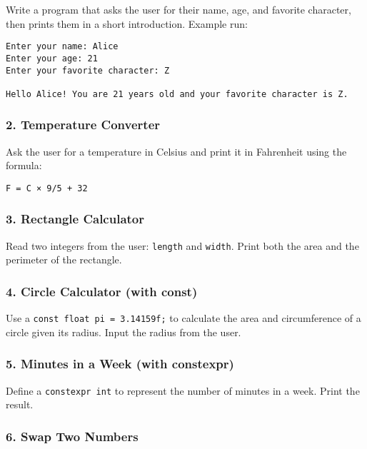 \documentclass[
  letterpaper,
  DIV=11,
  numbers=noendperiod]{scrreprt}
\begin{document}
Write a program that asks the user for their name, age, and favorite
character, then prints them in a short introduction. Example run:

\begin{verbatim}
Enter your name: Alice
Enter your age: 21
Enter your favorite character: Z

Hello Alice! You are 21 years old and your favorite character is Z.
\end{verbatim}

\subsubsection{2. Temperature Converter}\label{temperature-converter}

Ask the user for a temperature in Celsius and print it in Fahrenheit
using the formula:

\begin{verbatim}
F = C × 9/5 + 32
\end{verbatim}

\subsubsection{3. Rectangle Calculator}\label{rectangle-calculator}

Read two integers from the user: \texttt{length} and \texttt{width}.
Print both the area and the perimeter of the rectangle.

\subsubsection{4. Circle Calculator (with
const)}\label{circle-calculator-with-const}

Use a \texttt{const\ float\ pi\ =\ 3.14159f;} to calculate the area and
circumference of a circle given its radius. Input the radius from the
user.

\subsubsection{5. Minutes in a Week (with
constexpr)}\label{minutes-in-a-week-with-constexpr}

Define a \texttt{constexpr\ int} to represent the number of minutes in a
week. Print the result.

\subsubsection{6. Swap Two Numbers}\label{swap-two-numbers}
\end{document}
